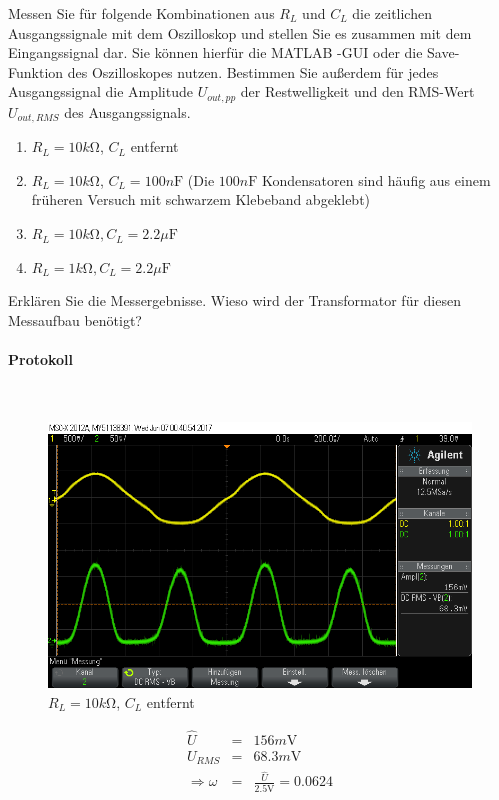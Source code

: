 \documentclass[10pt]{scrreprt}
\begin{document}
    Messen Sie für folgende Kombinationen aus $R_L$ und $C_L$ die zeitlichen Ausgangssignale mit
    dem Oszilloskop und stellen Sie es zusammen mit dem Eingangssignal dar. Sie können
    hierfür die MATLAB -GUI oder die Save-Funktion des Oszilloskopes nutzen. Bestimmen
    Sie außerdem für jedes Ausgangssignal die Amplitude $U_{out,pp}$ der Restwelligkeit und den
    RMS-Wert $U_{out,RMS}$ des Ausgangssignals.

    \begin{enumerate}
        \item $R_L  = 10\si{k \ohm}$, $C_L$ entfernt
        \item $R_L  = 10\si{k \ohm}$, $C_L = 100\si{n\farad}$ (Die $100\si{n\farad}$ Kondensatoren sind
            häufig aus einem früheren Versuch mit schwarzem Klebeband abgeklebt)
        \item $R_L  = 10\si{k \ohm}, C_L = 2.2\si{\mu\farad}$
        \item $R_L  = 1\si{k \ohm}, C_L = 2.2\si{\mu \farad}$
    \end{enumerate}
    Erklären Sie die Messergebnisse. Wieso wird der Transformator für diesen Messaufbau
    benötigt?

    \paragraph{Protokoll}
    $ $

    \begin{figure}[H]
        \includegraphics[width=\textwidth]{scope_4.png}
        \caption{$R_L  = 10\si{k \ohm}$, $C_L$ entfernt}
    \end{figure}

    \begin{eqnarray*}
        \hat{U} &=& 156\si{m\volt}\\
        U_{RMS} &=& 68.3\si{m\volt}\\
        \Rightarrow \omega &=& \frac{\hat{U}}{2.5\si{\volt}} = 0.0624
    \end{eqnarray*}
\end{document}

